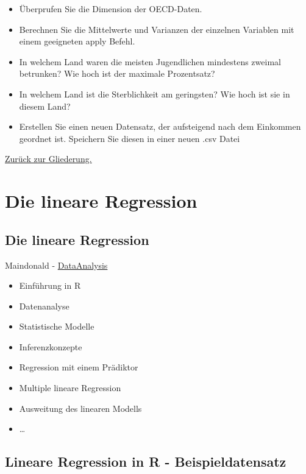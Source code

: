\documentclass[]{article}
\providecommand{\tightlist}{%
  \setlength{\itemsep}{0pt}\setlength{\parskip}{0pt}}
\begin{document}
\begin{itemize}
\item
  Überprufen Sie die Dimension der OECD-Daten.
\item
  Berechnen Sie die Mittelwerte und Varianzen der einzelnen Variablen
  mit einem geeigneten apply Befehl.
\item
  In welchem Land waren die meisten Jugendlichen mindestens zweimal
  betrunken? Wie hoch ist der maximale Prozentsatz?
\item
  In welchem Land ist die Sterblichkeit am geringsten? Wie hoch ist sie
  in diesem Land?
\item
  Erstellen Sie einen neuen Datensatz, der aufsteigend nach dem
  Einkommen geordnet ist. Speichern Sie diesen in einer neuen .csv Datei
\end{itemize}

\href{https://github.com/Japhilko/IntroR/blob/master/2016/README.md}{Zurück
zur Gliederung.}

\section{Die lineare Regression}\label{die-lineare-regression}

\subsection{Die lineare Regression}\label{die-lineare-regression-1}

Maindonald -
\href{https://cran.r-project.org/doc/contrib/usingR.pdf}{DataAnalysis}

\begin{itemize}
\tightlist
\item
  Einführung in R
\item
  Datenanalyse
\item
  Statistische Modelle
\item
  Inferenzkonzepte
\item
  Regression mit einem Prädiktor
\item
  Multiple lineare Regression
\item
  Ausweitung des linearen Modells
\item
  \ldots{}
\end{itemize}

\subsection{Lineare Regression in R -
Beispieldatensatz}\label{lineare-regression-in-r---beispieldatensatz}
\end{document}
